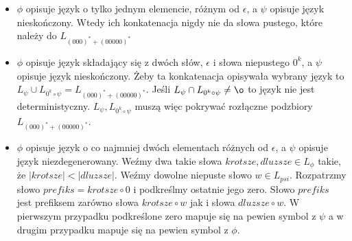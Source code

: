 \documentclass[a4paper]{article}
\begin{document}
\begin{enumerate}
\begin{itemize}
    \item $\phi$ opisuje język o tylko jednym elemencie, różnym od $\epsilon$, a $\psi$ opisuje język nieskończony. Wtedy ich konkatenacja nigdy nie da słowa pustego, które należy do $L_{(000)^* + (00000)^*}$
    \item $\phi$ opisuje język składający się z dwóch słów, $\epsilon$ i słowa niepustego $0^k$, a $\psi$ opisuje język nieskończony. Żeby ta konkatenacja opisywała wybrany język to $L_{\psi} \cup L_{0^k \circ \psi} = L_{(000)^* + (00000)^*}$. Jeśli $L_{\psi} \cap L_{0^k \circ \psi} \neq \o$ to język nie jest deterministyczny. $L_{\psi}, L_{0^k \circ \psi}$ muszą więc pokrywać rozłączne podzbiory $L_{(000)^* + (00000)^*}$.
    \item $\phi$ opisuje język o co najmniej dwóch elementach różnych od $\epsilon$, a $\psi$ opisuje język niezdegenerowany. Weźmy dwa takie słowa $krotsze, dluzsze \in L_{\phi}$ takie, że $|krotsze| < |dluzsze|$. Weźmy dowolne niepuste słowo $w \in L_{psi}$. Rozpatrzmy słowo $prefiks = krotsze \circ 0$ i podkreślmy ostatnie jego zero. Słowo $prefiks$ jest prefiksem zarówno słowa $krotsze \circ w$ jak i słowa $dluzsze \circ w$. W pierwszym przypadku podkreślone zero mapuje się na pewien symbol z $\psi$ a w drugim przypadku mapuje się na pewien symbol z $\phi$.
  \end{itemize}
\end{enumerate}
\end{document}
